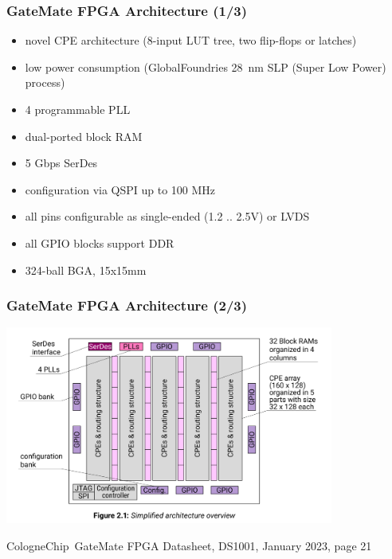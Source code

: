 \begin{frame}
  \frametitle{GateMate FPGA Architecture (1/3)}
  \begin{itemize}
  \item novel CPE architecture (8-input LUT tree, two flip-flops or latches)
  \item low power consumption (GlobalFoundries 28~nm SLP (Super Low
  Power) process)
  \item 4 programmable PLL
  \item dual-ported block RAM
  \item 5 Gbps SerDes
  \item configuration via QSPI up to 100 MHz
  \item all pins configurable as single-ended (1.2 .. 2.5V) or LVDS
  \item all GPIO blocks support DDR
  \item 324-ball BGA, 15x15mm
  \end{itemize}
\end{frame}

\begin{frame}
  \frametitle{GateMate FPGA Architecture (2/3)}

  \begin{center}
    \includegraphics[height=6.5cm]{Figure_2.1.png}

    \footnotesize{{CologneChip~GateMate} FPGA Datasheet, DS1001, January 2023, page 21}
\end{center}
\end{frame}

